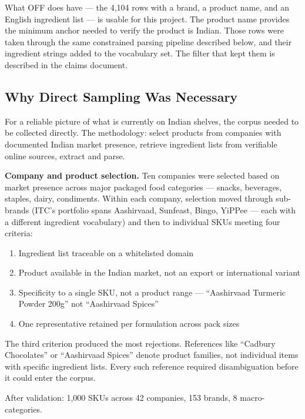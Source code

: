 \documentclass[
  letterpaper,
  DIV=11,
  numbers=noendperiod]{scrartcl}
\providecommand{\tightlist}{%
  \setlength{\itemsep}{0pt}\setlength{\parskip}{0pt}}
\begin{document}
What OFF does have --- the 4,104 rows with a brand, a product name, and
an English ingredient list --- is usable for this project. The product
name provides the minimum anchor needed to verify the product is Indian.
Those rows were taken through the same constrained parsing pipeline
described below, and their ingredient strings added to the vocabulary
set. The filter that kept them is described in the claims document.

\subsection{Why Direct Sampling Was
Necessary}\label{why-direct-sampling-was-necessary}

For a reliable picture of what is currently on Indian shelves, the
corpus needed to be collected directly. The methodology: select products
from companies with documented Indian market presence, retrieve
ingredient lists from verifiable online sources, extract and parse.

\textbf{Company and product selection.} Ten companies were selected
based on market presence across major packaged food categories ---
snacks, beverages, staples, dairy, condiments. Within each company,
selection moved through sub-brands (ITC's portfolio spans Aashirvaad,
Sunfeast, Bingo, YiPPee --- each with a different ingredient vocabulary)
and then to individual SKUs meeting four criteria:

\begin{enumerate}
\def\labelenumi{\arabic{enumi}.}
\tightlist
\item
  Ingredient list traceable on a whitelisted domain
\item
  Product available in the Indian market, not an export or international
  variant
\item
  Specificity to a single SKU, not a product range --- ``Aashirvaad
  Turmeric Powder 200g'' not ``Aashirvaad Spices''
\item
  One representative retained per formulation across pack sizes
\end{enumerate}

The third criterion produced the most rejections. References like
``Cadbury Chocolates'' or ``Aashirvaad Spices'' denote product families,
not individual items with specific ingredient lists. Every such
reference required disambiguation before it could enter the corpus.

After validation: 1,000 SKUs across 42 companies, 153 brands, 8
macro-categories.
\end{document}
